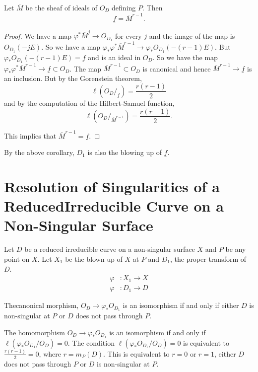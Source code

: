 \begin{Coro*}
Let $\overline{M}$ be the sheaf of ideals of $O_D$ defining $P$. Then 
$$
\underline{f}=\overline{M}^{r-1}.
$$
\end{Coro*}

\begin{proof}
We have a map $\varphi^*\overline{M}^j\longrightarrow O_{D_1}$ for
every $j$ and the image of the map is $O_{D_1}(-jE)$. So we have a map
$\varphi_* \varphi^*\overline{M}^{r-1}\longrightarrow\varphi_* O_{D_1}
(-(r-1)E)$. But $\varphi_*O_{D_1}(-(r-1)E)=\underline{f}$ and is an
ideal in $O_D$. So we have the map $\varphi_*\varphi^*
\overline{M}^{r-1}\longrightarrow\underline{f}\subset O_D$. The map
$\overline{M}^{r-1}\subset O_D$ is canonical and hence
$\overline{M}^{r-1}\longrightarrow\underline{f}$ is an inclusion. But
by the Gorenstein theorem,
$$
\ell(O_D/_{\underline{f}})=\frac{r(r-1)}{2}
$$
and by the computation of the Hilbert-Samuel function,
$$
\ell(O_D/_{\overline{M}^{r-1}})=\frac{r(r-1)}{2}.
$$

This implies that $\overline{M}^{r-1}=\underline{f}$.
\end{proof}

\begin{REM*}
By the above corollary, $D_1$ is also the blowing up of
$\underline{f}$. 
\end{REM*}

\section[Resolution of Singularities..]{Resolution of Singularities of
  a  Reduced\hfil\break Irreducible Curve on a Non-Singular
  Surface}\label{chap2:sec6} Let $D$ be a reduced irreducible curve on
a non-singular surface $X$ and $P$ be any point on $X$. Let $X_1$ be
the blown up of $X$ at $P$ and $D_1$, the proper transform of $D$.
\begin{align*}
\varphi &:X_1\longrightarrow X\\
\varphi &:D_1\longrightarrow D
\end{align*}

\begin{claim*}
The\pageoriginale canonical morphism,
$O_D\longrightarrow\varphi_*O_{D_1}$ is an isomorphism if and only if
either $D$ is non-singular at $P$ or $D$ does not pass through $P$.
\end{claim*}

The homomorphism $O_D\longrightarrow\varphi_*O_{D_1}$ is an
isomorphism if and only if $\ell(\varphi_*O_{D_1}/O_D)=0$. The
condition $\ell(\varphi_*O_{D_1}/O_D)=0$ is equivalent to
$\frac{r(r-1)}{2}=0$, where $r=m_P(D)$. This is equivalent to $r=0$ or
$r=1$, \ie either $D$ does not pass through $P$ or $D$ is non-singular
at $P$.


